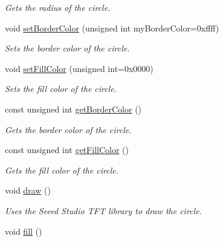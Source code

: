 \begin{DoxyCompactItemize}
\begin{DoxyCompactList}\small\item\em Gets the radius of the circle. \end{DoxyCompactList}\item 
void \hyperlink{class_circle_a2d0e705f07a4cb6a9d47eb759c73c59f}{set\+Border\+Color} (unsigned int my\+Border\+Color=0xffff)
\begin{DoxyCompactList}\small\item\em Sets the border color of the circle. \end{DoxyCompactList}\item 
void \hyperlink{class_circle_ab5f942fd85063fbb4bfc28fc4e700eca}{set\+Fill\+Color} (unsigned int=0x0000)
\begin{DoxyCompactList}\small\item\em Sets the fill color of the circle. \end{DoxyCompactList}\item 
\hypertarget{class_circle_ad6ce91ec588489091a42d02dda0b074a}{const unsigned int \hyperlink{class_circle_ad6ce91ec588489091a42d02dda0b074a}{get\+Border\+Color} ()}\label{class_circle_ad6ce91ec588489091a42d02dda0b074a}

\begin{DoxyCompactList}\small\item\em Gets the border color of the circle. \end{DoxyCompactList}\item 
const unsigned int \hyperlink{class_circle_a567e34480ed3af231bd019f66ab80fb7}{get\+Fill\+Color} ()
\begin{DoxyCompactList}\small\item\em Gets the fill color of the circle. \end{DoxyCompactList}\item 
\hypertarget{class_circle_a3a3f7166e7f629e44f9044b0e537eb22}{void \hyperlink{class_circle_a3a3f7166e7f629e44f9044b0e537eb22}{draw} ()}\label{class_circle_a3a3f7166e7f629e44f9044b0e537eb22}

\begin{DoxyCompactList}\small\item\em Uses the Seeed Studio T\+F\+T library to draw the circle. \end{DoxyCompactList}\item 
\hypertarget{class_circle_af69594749622c501d7a0c65715704e67}{void \hyperlink{class_circle_af69594749622c501d7a0c65715704e67}{fill} ()}\label{class_circle_af69594749622c501d7a0c65715704e67}


\end{DoxyCompactItemize}
